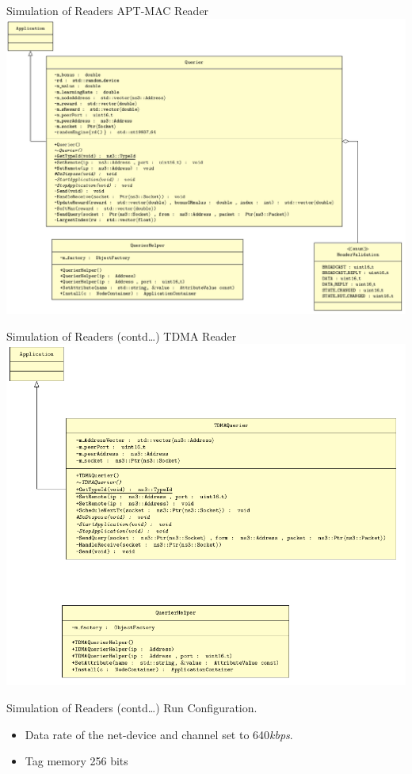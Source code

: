 \documentclass [xcolor=svgnames, t] {beamer}
\begin{document}
\begin{frame}{Simulation of Readers}
    APT-MAC Reader\\
    \vspace{.5cm}
    \includegraphics[width=.75\textwidth,height=.75\textheight]{querrier-class-diagram}
    \label{fig_apt-mac-readerUML}

\end{frame}



\begin{frame}{Simulation of Readers (contd\ldots)}
    TDMA Reader\\
    \vspace{.5cm}
    \includegraphics[width=.75\textwidth,height=.75\textheight]{tdma-class-diagram}
    \label{fig_apt-mac-readerUML}
\end{frame}


\begin{frame}{Simulation of Readers (contd\ldots)}
    Run Configuration.\\
    \vspace{.5cm}
    \begin{itemize}
        \item Data rate of the net-device and channel set to 640\textit{kbps}.
        \item Tag memory 256 bits
    \end{itemize}
\end{frame}
\end{document}
